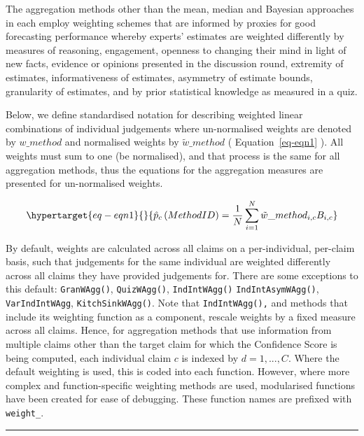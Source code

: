 \documentclass[article]{jss}
\begin{document}
The aggregation methods other than the mean, median and Bayesian
approaches in  each employ weighting schemes that are
informed by proxies for good forecasting performance whereby experts'
estimates are weighted differently by measures of reasoning, engagement,
openness to changing their mind in light of new facts, evidence or
opinions presented in the discussion round, extremity of estimates,
informativeness of estimates, asymmetry of estimate bounds, granularity
of estimates, and by prior statistical knowledge as measured in a quiz.

Below, we define standardised notation for describing weighted linear
combinations of individual judgements where un-normalised weights are
denoted by \(w\_method\) and normalised weights by
\(\tilde{w} \_ method\) ( Equation~\ref{eq-eqn1} ). All weights must sum
to one (be normalised), and that process is the same for all aggregation
methods, thus the equations for the aggregation measures are presented
for un-normalised weights.

\begin{equation}\protect\hypertarget{eq-eqn1}{}{
\hat{p}_c\left(Method \space ID \right) = \frac{1}{N}\sum_{i=1}^N \tilde{w}\_{method}_{i,c}  B_{i,c}
}\label{eq-eqn1}\end{equation}

By default, weights are calculated across all claims on a
per-individual, per-claim basis, such that judgements for the same
individual are weighted differently across all claims they have provided
judgements for. There are some exceptions to this default:
\texttt{GranWAgg()}, \texttt{QuizWAgg()}, \texttt{IndIntWAgg()}
\texttt{IndIntAsymWAgg()}, \texttt{VarIndIntWAgg},
\texttt{KitchSinkWAgg()}. Note that \texttt{IndIntWAgg(),} and methods
that include its weighting function as a component, rescale weights by a
fixed measure across all claims. Hence, for aggregation methods that use
information from multiple claims other than the target claim for which
the Confidence Score is being computed, each individual claim \(c\) is
indexed by \(d = 1, ..., C\). Where the default weighting is used, this
is coded into each function. However, where more complex and
function-specific weighting methods are used, modularised functions have
been created for ease of debugging. These function names are prefixed
with \texttt{weight\_}.

\begin{center}\rule{0.5\linewidth}{0.5pt}\end{center}
\end{document}
